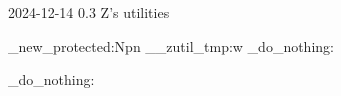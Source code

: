  {2024-12-14} {0.3}
  {Z's utilities}

\cs_new_protected:Npn \__zutil_tmp:w
  {
    \ExplSyntaxOn
    \ExplSyntaxOff
    \prg_do_nothing:
  }

\prg_do_nothing:
